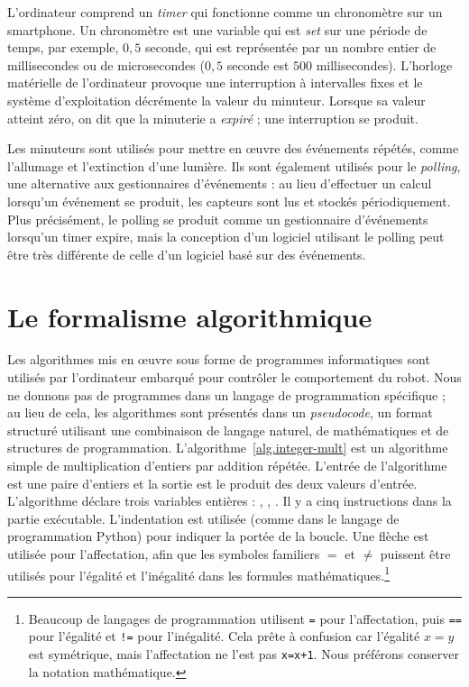 {L'ordinateur comprend un \emph{timer} qui fonctionne comme un chronomètre sur un smartphone. Un chronomètre est une variable qui est \emph{set} sur une période de temps, par exemple, $0,5$ seconde, qui est représentée par un nombre entier de millisecondes ou de microsecondes ($0,5$ seconde est $500$ millisecondes). L'horloge matérielle de l'ordinateur provoque une interruption à intervalles fixes et le système d'exploitation décrémente la valeur du minuteur. Lorsque sa valeur atteint zéro, on dit que la minuterie a \emph{expiré} ; une interruption se produit.

Les minuteurs sont utilisés pour mettre en œuvre des événements répétés, comme l'allumage et l'extinction d'une lumière. Ils sont également utilisés pour le \emph{polling}, une alternative aux gestionnaires d'événements : au lieu d'effectuer un calcul lorsqu'un événement se produit, les capteurs sont lus et stockés périodiquement. Plus précisément, le polling se produit comme un gestionnaire d'événements lorsqu'un timer expire, mais la conception d'un logiciel utilisant le polling peut être très différente de celle d'un logiciel basé sur des événements.

\section{Le formalisme algorithmique}\label{s.alg-formalism}

Les algorithmes mis en œuvre sous forme de programmes informatiques sont utilisés par l'ordinateur embarqué pour contrôler le comportement du robot. Nous ne donnons pas de programmes dans un langage de programmation spécifique ; au lieu de cela, les algorithmes sont présentés dans un \emph{pseudocode}, un format structuré utilisant une combinaison de langage naturel, de mathématiques et de structures de programmation. L'algorithme~\ref{alg.integer-mult} est un algorithme simple de multiplication d'entiers par addition répétée. L'entrée de l'algorithme est une paire d'entiers et la sortie est le produit des deux valeurs d'entrée. L'algorithme déclare trois variables entières : , , . Il y a cinq instructions dans la partie exécutable. L'indentation est utilisée (comme dans le langage de programmation Python) pour indiquer la portée de la boucle. Une flèche est utilisée pour l'affectation, afin que les symboles familiers $=$ et $\neq$ puissent être utilisés pour l'égalité et l'inégalité dans les formules mathématiques.\footnote{Beaucoup de langages de programmation utilisent \texttt{=} pour l'affectation, puis \texttt{==} pour l'égalité et \texttt{!=} pour l'inégalité. Cela prête à confusion car l'égalité $x=y$ est symétrique, mais l'affectation ne l'est pas \texttt{x=x+1}. Nous préférons conserver la notation mathématique.}

}
